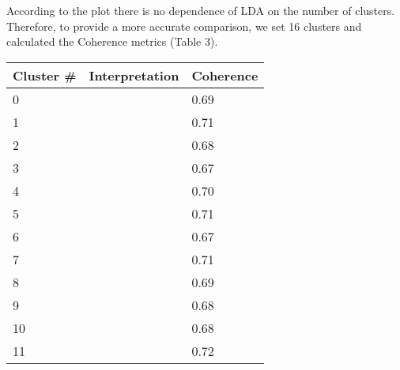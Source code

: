 According to the plot there is no dependence of LDA on the number of clusters. Therefore, to provide a more accurate comparison, we set 16 clusters and calculated the Coherence metrics (Table 3). 

\begin{table}[h]
\centering
\begin{tabular}{|l|l|l|}
\hline
\multicolumn{1}{|c|}{\textbf{Cluster \#}} & \multicolumn{1}{c|}{\textbf{Interpretation}} & \multicolumn{1}{c|}{\textbf{Coherence}} \\ \hline
0                                         &                                              & 0.69                                    \\ \hline
1                                         &                                              & 0.71                                    \\ \hline
2                                         &                                              & 0.68                                    \\ \hline
3                                         &                                              & 0.67                                    \\ \hline
4                                         &                                              & 0.70                                    \\ \hline
5                                         &                                              & 0.71                                    \\ \hline
6                                         &                                              & 0.67                                    \\ \hline
7                                         &                                              & 0.71                                    \\ \hline
8                                         &                                              & 0.69                                    \\ \hline
9                                         &                                              & 0.68                                    \\ \hline
10                                        &                                              & 0.68                                    \\ \hline
11                                        &                                              & 0.72                                    \\ \hline

\end{tabular}
\end{table}
